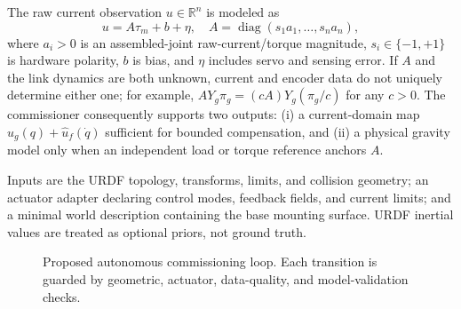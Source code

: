 \documentclass[conference]{IEEEtran}
\begin{document}
The raw current observation $u\in\mathbb R^n$ is modeled as
\begin{equation}
 u=A\tau_m+b+\eta,\quad A=\operatorname{diag}(s_1a_1,\ldots,s_na_n),
 \label{eq:current_observation}
\end{equation}
where $a_i>0$ is an assembled-joint raw-current/torque magnitude,
$s_i\in\{-1,+1\}$ is hardware polarity, $b$ is bias, and $\eta$ includes servo
and sensing error. If $A$ and the link dynamics are both unknown, current and
encoder data do not uniquely determine either one; for example,
$AY_g\pi_g=(cA)Y_g(\pi_g/c)$ for any $c>0$. The
commissioner consequently supports two outputs: (i) a current-domain map
$\hat u_g(q)+\hat u_f(\dot q)$ sufficient for bounded compensation, and (ii) a
physical gravity model only when an independent load or torque reference
anchors $A$.

Inputs are the URDF topology, transforms, limits, and collision geometry; an
actuator adapter declaring control modes, feedback fields, and current limits;
and a minimal world description containing the base mounting surface. URDF
inertial values are treated as optional priors, not ground truth.

\begin{figure}[t]
\centering
{}
\caption{Proposed autonomous commissioning loop. Each transition is guarded by
geometric, actuator, data-quality, and model-validation checks.}
\label{fig:architecture}
\end{figure}
\end{document}
